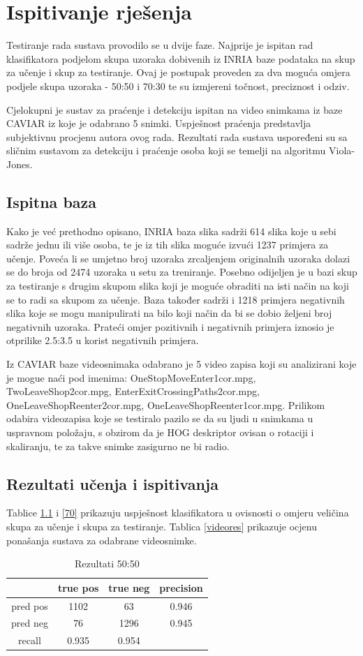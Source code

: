 \documentclass[times, utf8, seminar, numeric]{fer}
\begin{document}
\chapter{Ispitivanje rješenja}
Testiranje rada sustava provodilo se u dvije faze. Najprije je ispitan rad klasifikatora podjelom skupa uzoraka dobivenih iz INRIA baze podataka na skup za učenje i skup za testiranje. Ovaj je postupak proveden za dva moguća omjera podjele skupa uzoraka - 50:50 i  70:30 te su izmjereni točnost, preciznost i odziv.

Cjelokupni je sustav za praćenje i detekciju ispitan na video snimkama iz baze CAVIAR iz koje je odabrano 5 snimki. Uspješnost praćenja predstavlja subjektivnu procjenu autora ovog rada. Rezultati rada sustava uspoređeni su sa sličnim sustavom za detekciju i praćenje osoba koji se temelji na algoritmu Viola-Jones.
\section{Ispitna baza}
Kako je već prethodno opisano, INRIA baza slika sadrži 614 slika koje u sebi sadrže jednu ili više osoba, te je iz tih slika moguće izvući  1237 primjera za učenje. Poveća li se umjetno broj uzoraka zrcaljenjem originalnih uzoraka dolazi se do broja od 2474 uzoraka u setu za treniranje. Posebno odijeljen je u bazi skup za testiranje s drugim skupom slika koji je moguće obraditi na isti način na koji se to radi sa skupom za učenje. Baza također sadrži  i 1218 primjera negativnih slika koje se mogu manipulirati na bilo koji način da bi se dobio željeni broj negativnih uzoraka. Prateći \cite{hog} omjer pozitivnih i negativnih primjera iznosio je otprilike 2.5:3.5 u korist negativnih primjera.    

Iz CAVIAR baze videosnimaka odabrano je 5 video zapisa koji su analizirani koje je mogue naći pod imenima: OneStopMoveEnter1cor.mpg, TwoLeaveShop2cor.mpg, EnterExitCrossingPaths2cor.mpg, OneLeaveShopReenter2cor.mpg, OneLeaveShopReenter1cor.mpg. Prilikom odabira videozapisa koje se testiralo pazilo se da su ljudi u snimkama u uspravnom položaju, s obzirom da je HOG deskriptor ovisan o rotaciji i skaliranju, te za takve snimke zasigurno ne bi radio.
\section{Rezultati učenja i ispitivanja}
Tablice \ref{50} i \ref{70} prikazuju uspješnost klasifikatora u ovisnosti o omjeru veličina skupa za učenje i skupa za testiranje. Tablica \ref{videores} prikazuje ocjenu ponašanja sustava za odabrane videosnimke.
\begin{table}
\begin{center}
\begin{tabular}{|c|c|c|c|}
\hline
 & true pos & true neg& precision\\ \hline
pred pos & 1102 & 63 &0.946\\ \hline
pred neg & 76 & 1296 &0.945\\ \hline
recall &0.935 & 0.954& \\ \hline
\end{tabular}
\end{center}
\caption{Rezultati 50:50}
\label{50}
\end{table}
\end{document}
